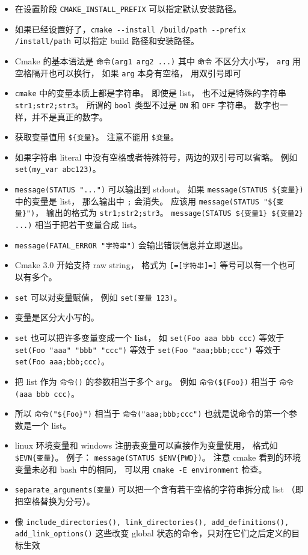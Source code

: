 \begin{itemize}
\item 在设置阶段 \verb`CMAKE_INSTALL_PREFIX` 可以指定默认安装路径。
\item 如果已经设置好了，\verb`cmake --install /build/path --prefix /install/path` 可以指定 build 路径和安装路径。
\item Cmake 的基本语法是 \verb`命令(arg1 arg2 ...)` 其中 \verb`命令` 不区分大小写， \verb`arg` 用空格隔开也可以换行， 如果 \verb`arg` 本身有空格， 用双引号即可
\item \verb`cmake` 中的变量本质上都是字符串。 即使是 list， 也不过是特殊的字符串 \verb`str1;str2;str3`。 所谓的 \verb`bool` 类型不过是 \verb`ON` 和 \verb`OFF` 字符串。 数字也一样，并不是真正的数字。
\item 获取变量值用 \verb`${变量}`。 注意不能用 \verb`$变量`。
\item 如果字符串 literal 中没有空格或者特殊符号，两边的双引号可以省略。 例如 \verb`set(my_var abc123)`。
\item \verb`message(STATUS "...")` 可以输出到 stdout。 如果 \verb`message(STATUS ${变量})` 中的变量是 list， 那么输出中 \verb`;` 会消失。 应该用 \verb`message(STATUS "${变量}")`， 输出的格式为 \verb`str1;str2;str3`。 \verb`message(STATUS ${变量1} ${变量2} ...)` 相当于把若干变量合成 list。
\item \verb`message(FATAL_ERROR "字符串")` 会输出错误信息并立即退出。
\item Cmake 3.0 开始支持 raw string， 格式为 \verb`[=[字符串]=]` 等号可以有一个也可以有多个。
\item \verb`set` 可以对变量赋值， 例如 \verb`set(变量 123)`。
\item 变量是区分大小写的。
\item \verb`set` 也可以把许多变量变成一个 \textbf{list}， 如 \verb`set(Foo aaa bbb ccc)` 等效于 \verb`set(Foo "aaa" "bbb" "ccc")` 等效于 \verb`set(Foo "aaa;bbb;ccc")` 等效于 \verb`set(Foo aaa;bbb;ccc)`。
\item 把 list 作为 \verb`命令()` 的参数相当于多个 \verb`arg`。 例如 \verb`命令(${Foo})` 相当于 \verb`命令(aaa bbb ccc)`。
\item 所以 \verb`命令("${Foo}")` 相当于 \verb`命令("aaa;bbb;ccc")` 也就是说命令的第一个参数是一个 list。
\item linux 环境变量和 windows 注册表变量可以直接作为变量使用， 格式如 \verb`$EVN{变量}`。 例子： \verb`message(STATUS $ENV{PWD})`。 注意 cmake 看到的环境变量未必和 bash 中的相同， 可以用 \verb`cmake -E environment` 检查。
\item \verb`separate_arguments(变量)` 可以把一个含有若干空格的字符串拆分成 list （即把空格替换为分号）。
\item 像 \verb`include_directories(), link_directories(), add_definitions(), add_link_options()` 这些改变 global 状态的命令，只对在它们之后定义的目标生效
\end{itemize}

